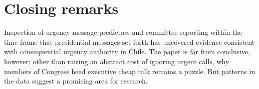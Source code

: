 \documentclass[letter,12pt]{article}
\begin{document}



\section{Closing remarks}

Inspection of urgency message predictors and committee reporting within the time frame that presidential messages set forth has uncovered evidence consistent with consequential urgency authority in Chile. The paper is far from conclusive, however: other than raising an abstract cost of ignoring urgent calls, why members of Congress heed executive cheap talk remains a puzzle. But patterns in the data suggest a promising area for research.  
\end{document}
